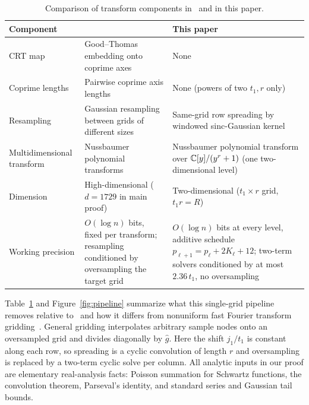 \begin{table}[!ht]
\centering
\small
\caption{Comparison of transform components in~\cite{HvdH21} and in this paper.}
\label{tab:components}
\setlength{\tabcolsep}{6pt}
\begin{tabular}{@{}>{\raggedright}p{}>{\raggedright}p{}>{\raggedright\arraybackslash}p{}@{}}
\toprule
Component & \cite{HvdH21} & This paper \\
\midrule
CRT map & Good--Thomas embedding onto coprime axes & None \\\addlinespace[2pt]
Coprime lengths & Pairwise coprime axis lengths & None (powers of two $t_1, r$ only) \\\addlinespace[2pt]
Resampling & Gaussian resampling between grids of different sizes & Same-grid row spreading by windowed sinc-Gaussian kernel \\\addlinespace[2pt]
Multidimensional transform & Nussbaumer polynomial transforms & Nussbaumer polynomial transform over $\mathbb{C}[y]/(y^r + 1)$ (one two-dimensional level) \\\addlinespace[2pt]
Dimension & High-dimensional ($d = 1729$ in main proof) & Two-dimensional ($t_1 \times r$ grid, $t_1 r = R$) \\\addlinespace[2pt]
Working precision & $O(\log n)$ bits, fixed per transform; resampling conditioned by oversampling the target grid & $O(\log n)$ bits at every level, additive schedule $p_{\ell+1} = p_\ell + 2K_\ell + 12$; two-term solvers conditioned by at most $2.36\,t_1$, no oversampling \\
\bottomrule
\end{tabular}
\end{table}

Table~\ref{tab:components} and Figure~\ref{fig:pipeline} summarize what this single-grid pipeline removes relative to~\cite{HvdH21} and how it differs from nonuniform fast Fourier transform gridding~\cite{DR93,PST01,GL04,BMK19}. General gridding interpolates arbitrary sample nodes onto an oversampled grid and divides diagonally by $\hat{g}$. Here the shift $j_1 / t_1$ is constant along each row, so spreading is a cyclic convolution of length $r$ and oversampling is replaced by a two-term cyclic solve per column. All analytic inputs in our proof are elementary real-analysis facts: Poisson summation for Schwartz functions, the convolution theorem, Parseval's identity, and standard series and Gaussian tail bounds.

